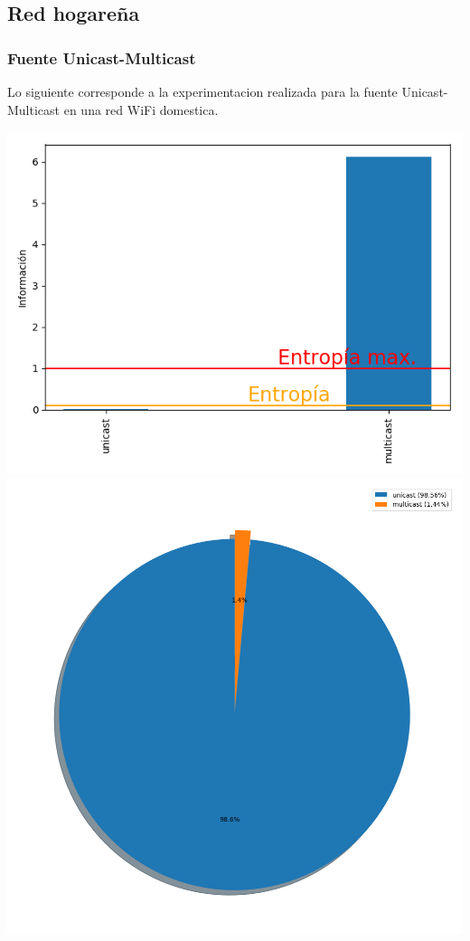 \subsection{Red hogareña}

\subsubsection{Fuente Unicast-Multicast}

 Lo siguiente corresponde a la experimentacion realizada para la fuente Unicast-Multicast en una red WiFi domestica.
 
\hspace*{-1.5cm}
 \includegraphics[scale=0.6]{../plots/mauro_s1_informacion.png}
 \includegraphics[scale=0.4]{../plots/mauro_s1_probabilidades.png}

